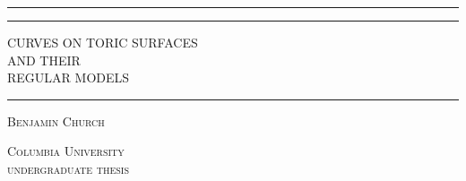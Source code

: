\documentclass[12pt]{article}
\begin{document}

\begin{titlepage} %
	
	\centering %
	
	
	\rule{\textwidth}{1pt} %
	
	\vspace{2pt}\vspace{-\baselineskip} %
	
	\rule{\textwidth}{0.4pt} %
	
	\vspace{0.1\textheight} %
	
	
		{\Huge CURVES ON TORIC SURFACES}\\[0.5\baselineskip] %
		{\Large AND THEIR}\\[0.5\baselineskip] %
		{\Huge REGULAR MODELS} %
	
	\vspace{0.025\textheight} %
	
	\rule{0.3\textwidth}{0.4pt} %
	
	\vspace{0.1\textheight} %
	
	
	{\Large \textsc{Benjamin Church}} %
	
	\vfill %
	

	{\Large\textsc{Columbia University}} %
	\\
	{\large\textsc{undergraduate thesis}}
	

\end{titlepage}
\end{document}
